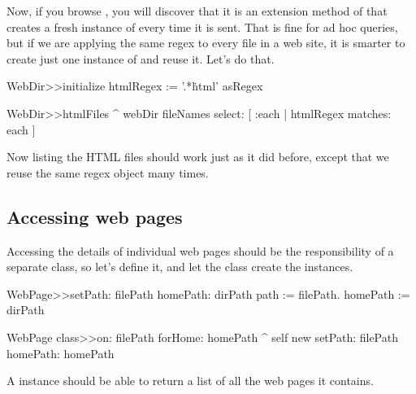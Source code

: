 \documentclass[a4paper,10pt,twoside]{book}
\begin{document}
Now, if you browse , you will discover that it is an extension method of  that creates a fresh instance of  every time it is sent.  That is fine for ad hoc queries, but if we are applying the same regex to every file in a web site, it is smarter to create just one instance of  and reuse it. Let's do that.


\begin{code}{}
WebDir>>initialize
	htmlRegex := '.*\.html' asRegex

WebDir>>htmlFiles
	^ webDir fileNames select: [ :each | htmlRegex matches: each ]
\end{code}

Now listing the HTML files should work just as it did before, except that we reuse the same regex object many times.

\subsection{Accessing web pages}

Accessing the details of individual web pages should be the responsibility of a separate class, so let's define it, and let the  class create the instances.


\begin{code}{}
WebPage>>setPath: filePath homePath: dirPath 
	path := filePath.
	homePath := dirPath

WebPage class>>on: filePath forHome: homePath
	^ self new setPath: filePath homePath: homePath
\end{code}

A  instance should be able to return a list of all the web pages it contains.
\end{document}
